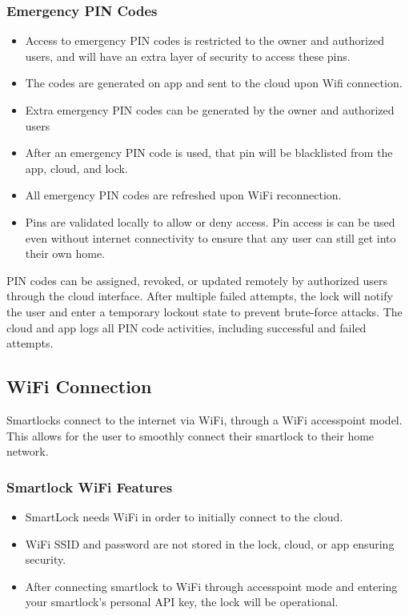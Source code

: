 \subsubsection*{Emergency PIN Codes}
\begin{itemize}
    \item Access to emergency PIN codes is restricted to the owner and authorized users, and will have an extra layer of security to access these pins.
    \item The codes are generated on app and sent to the cloud upon Wifi connection.
    \item Extra emergency PIN codes can be generated by the owner and authorized users
    \item After an emergency PIN code is used, that pin will be blacklisted from the app, cloud, and lock.
    \item All emergency PIN codes are refreshed upon WiFi reconnection. 
    \item Pins are validated locally to allow or deny access. Pin access is can be used even without internet connectivity to ensure that any user can still get into their own home.
    \newline
\end{itemize}

    
PIN codes can be assigned, revoked, or updated remotely by authorized users through the cloud interface. After multiple failed attempts, the lock will notify the user and enter a temporary lockout state to prevent brute-force attacks. The cloud and app logs all PIN code activities, including successful and failed attempts.

\subsection{WiFi Connection}
Smartlocks connect to the internet via WiFi, through a WiFi accesspoint model. This allows for the user to smoothly connect their smartlock to their home network.

\subsubsection*{Smartlock WiFi Features}
\begin{itemize}
    \item SmartLock needs WiFi in order to initially connect to the cloud.
    \item WiFi SSID and password are not stored in the lock, cloud, or app ensuring security.
    \item After connecting smartlock to WiFi through accesspoint mode and entering your smartlock's personal API key, the lock will be operational.
\end{itemize}

